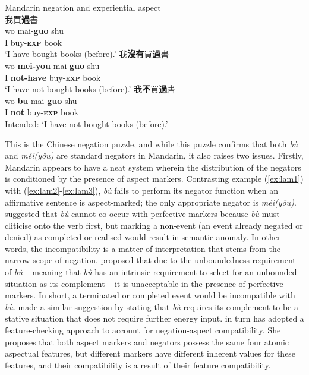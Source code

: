 \documentclass[output=paper]{langscibook}
\begin{document}
\ea Mandarin negation and experiential aspect \label{ex:lam3}\\
  \ea 我買\textbf{過}書 \label{ex:lam3a}\\
    \gll wo	mai-\textbf{guo} shu\\
	I buy-\textbf{\textsc{exp}} book\\
	\glt `I have bought books (before).'
  \ex 我\textbf{沒有}買\textbf{過}書 \label{ex:lam3b}\\
    \gll wo	\textbf{mei-you} mai-\textbf{guo} shu\\
	I \textbf{not-have} buy-\textbf{\textsc{exp}} book\\
	\glt `I have not bought books (before).'
  \ex 我\textbf{不}買\textbf{過}書 \label{ex:lam3c}\\
  \gll *wo \textbf{bu} mai-\textbf{guo} shu \\
  	I \textbf{not} buy-\textbf{\textsc{exp}} book\\
  	\glt Intended: `I have not bought books (before).'
\z \z

This is the Chinese negation puzzle, and while this puzzle confirms that both \textit{bù} and \textit{méi(yǒu)} are standard negators in Mandarin, it also raises two issues. Firstly, Mandarin appears to have a neat system wherein the distribution of the negators is conditioned by the presence of aspect markers. Contrasting example (\ref{ex:lam1}) with (\ref{ex:lam2}-\ref{ex:lam3}), \textit{bù} fails to perform its negator function when an affirmative sentence is aspect-marked; the only appropriate negator is \textit{méi(yǒu)}. \cite{Huang1988} suggested that \textit{bù} cannot co-occur with perfective markers because \textit{bù} must cliticise onto the verb first, but marking a non-event (an event already negated or denied) as completed or realised would result in semantic anomaly. In other words, the incompatibility is a matter of interpretation that stems from the narrow scope of negation. \cite{Ernst1995} proposed that due to the unboundedness requirement of \textit{bù} – meaning that \textit{bù} has an intrinsic requirement to select for an unbounded situation as its complement – it is unacceptable in the presence of perfective markers. In short, a terminated or completed event would be incompatible with \textit{bù}. \cite{Lin2003} made a similar suggestion by stating that \textit{bù} requires its complement to be a stative situation that does not require further energy input. \cite{Li2007} in turn has adopted a feature-checking approach to account for negation-aspect compatibility. She proposes that both aspect markers and negators possess the same four atomic aspectual features, but different markers have different inherent values for these features, and their compatibility is a result of their feature compatibility. 
\end{document}
